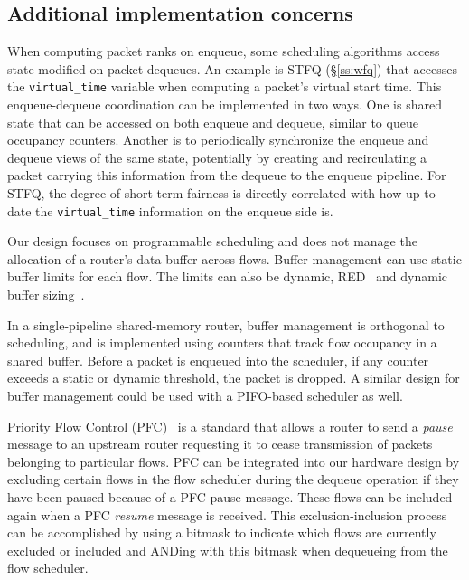 \subsection{Additional implementation concerns}
\label{ss:add_impl}

When computing packet ranks on enqueue, some scheduling algorithms access state
modified on packet dequeues. An example is STFQ (\S\ref{ss:wfq}) that accesses
the \texttt{virtual\_time} variable when computing a packet's virtual start
time. This enqueue-dequeue coordination can be implemented in two ways.  One is
shared state that can be accessed on both enqueue and dequeue, similar to queue
occupancy counters. Another is to periodically synchronize the enqueue and
dequeue views of the same state, potentially by creating and recirculating a
packet carrying this information from the dequeue to the enqueue pipeline.  For
STFQ, the degree of short-term fairness is directly correlated with how
up-to-date the \texttt{virtual\_time} information on the enqueue side is.

Our design focuses on programmable scheduling and does not manage the
allocation of a router's data buffer across flows.  Buffer management can use
static buffer limits for each flow. The limits can also be dynamic, \eg
RED~\cite{red} and dynamic buffer sizing~\cite{broadcom_dynamic}.

In a single-pipeline shared-memory router, buffer management is orthogonal to
scheduling, and is implemented using counters that track flow occupancy in a
shared buffer. Before a packet is enqueued into the scheduler, if any counter
exceeds a static or dynamic threshold, the packet is dropped. A similar design
for buffer management could be used with a PIFO-based scheduler as well.

Priority Flow Control (PFC)~\cite{pfc} is a standard that allows a router to
send a {\em pause} message to an upstream router requesting it to cease
transmission of packets belonging to particular flows. PFC can be integrated
into our hardware design by excluding certain flows in the flow scheduler
during the dequeue operation if they have been paused because of a PFC pause
message. These flows can be included again when a PFC {\em resume} message is
received.  This exclusion-inclusion process can be accomplished by using a
bitmask to indicate which flows are currently excluded or included and ANDing
with this bitmask when dequeueing from the flow scheduler.
